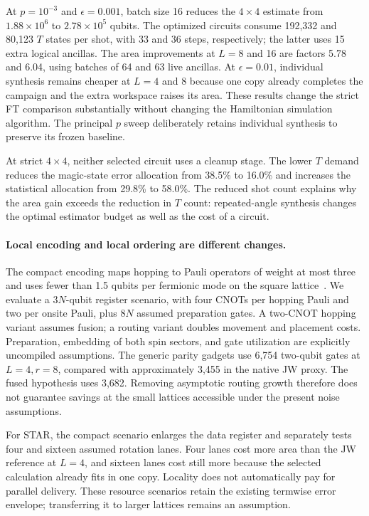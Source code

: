 \documentclass[11pt]{article}
\newcommand{\eps}{\epsilon}
\begin{document}
At $p=10^{-3}$ and $\eps=0.001$, batch size 16 reduces the
$4\times4$ estimate from $1.88\times10^6$ to $2.78\times10^5$ qubits.
The optimized circuits consume 192,332 and 80,123 $T$ states per shot,
with 33 and 36 steps, respectively; the latter uses 15 extra logical
ancillas. The area improvements at $L=8$ and 16 are factors 5.78 and
6.04, using batches of 64 and 63 live ancillas. At $\eps=0.01$,
individual synthesis remains cheaper at $L=4$ and 8 because one copy
already completes the campaign and the extra workspace raises its area.
These results change the strict FT comparison substantially without
changing the Hamiltonian simulation algorithm. The principal $p$ sweep
deliberately retains individual synthesis to preserve its frozen baseline.

At strict $4\times4$, neither selected circuit uses a cleanup stage.
The lower $T$ demand reduces the magic-state error allocation from 38.5\%
to 16.0\% and increases the statistical allocation from 29.8\% to 58.0\%.
The reduced shot count explains why the area gain exceeds the reduction in
$T$ count: repeated-angle synthesis changes the optimal estimator budget as
well as the cost of a circuit.

\paragraph{Local encoding and local ordering are different changes.}
The compact encoding maps hopping to Pauli operators of weight at most
three and uses fewer than 1.5 qubits per fermionic mode on the square
lattice~\cite{derbyklassen}. We evaluate a $3N$-qubit register scenario,
with four CNOTs per hopping Pauli and two per onsite Pauli, plus $8N$
assumed preparation gates. A two-CNOT hopping variant assumes fusion;
a routing variant doubles movement and placement costs. Preparation,
embedding of both spin sectors, and gate utilization are explicitly
uncompiled assumptions. The generic parity gadgets use 6,754 two-qubit
gates at $L=4,r=8$, compared with approximately 3,455 in the native
JW proxy. The fused hypothesis uses 3,682. Removing asymptotic routing
growth therefore does not guarantee savings at the small lattices
accessible under the present noise assumptions.

For STAR, the compact scenario enlarges the data register and separately
tests four and sixteen assumed rotation lanes. Four lanes cost more area
than the JW reference at $L=4$, and sixteen lanes cost still more because
the selected calculation already fits in one copy. Locality does not
automatically pay for parallel delivery. These resource scenarios retain
the existing termwise error envelope; transferring it to larger lattices
remains an assumption.
\end{document}
